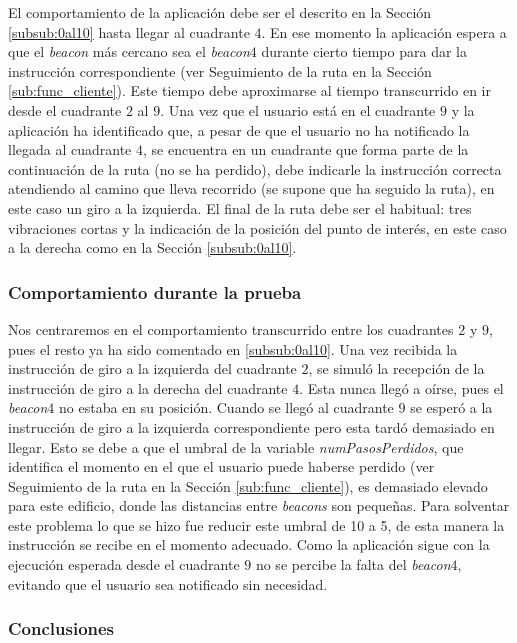 El comportamiento de la aplicación debe ser el descrito en la Sección \ref{subsub:0al10} hasta llegar al cuadrante $4$. En ese momento la aplicación espera a que el \textit{beacon} más cercano sea el \textit{beacon$4$} durante cierto tiempo para dar la instrucción correspondiente (ver Seguimiento de la ruta en la Sección \ref{sub:func_cliente}). Este tiempo debe aproximarse al tiempo transcurrido en ir desde el cuadrante $2$ al $9$. Una vez que el usuario está en el cuadrante $9$ y la aplicación ha identificado que, a pesar de que el usuario no ha notificado la llegada al cuadrante $4$, se encuentra en un cuadrante que forma parte de la continuación de la ruta (no se ha perdido), debe indicarle la instrucción correcta atendiendo al camino que lleva recorrido (se supone que ha seguido la ruta), en este caso un giro a la izquierda. El final de la ruta debe ser el habitual: tres vibraciones cortas y la indicación de la posición del punto de interés, en este caso a la derecha como en la Sección \ref{subsub:0al10}.


\subsubsection*{Comportamiento durante la prueba}

Nos centraremos en el comportamiento transcurrido entre los cuadrantes $2$ y $9$, pues el resto ya ha sido comentado en \ref{subsub:0al10}. Una vez recibida la instrucción de giro a la izquierda del cuadrante $2$, se simuló la recepción de la instrucción de giro a la derecha del cuadrante $4$. Esta nunca llegó a oírse, pues el \textit{beacon$4$} no estaba en su posición. Cuando se llegó al cuadrante $9$ se esperó a la instrucción de giro a la izquierda correspondiente pero esta tardó demasiado en llegar. Esto se debe a que el umbral de la variable \textit{numPasosPerdidos}, que identifica el momento en el que el usuario puede haberse perdido (ver Seguimiento de la ruta en la Sección \ref{sub:func_cliente}), es demasiado elevado para este edificio, donde las distancias entre \textit{beacons} son pequeñas. Para solventar este problema lo que se hizo fue reducir este umbral de 10 a 5, de esta manera la instrucción se recibe en el momento adecuado. Como la aplicación sigue con la ejecución esperada desde el cuadrante $9$ no se percibe la falta del \textit{beacon$4$}, evitando que el usuario sea notificado sin necesidad.


\subsubsection*{Conclusiones}


